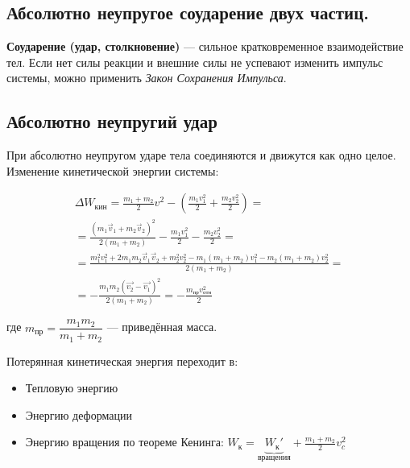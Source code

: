 \subsection{Абсолютно неупругое соударение двух частиц.}
\textbf{Соударение (удар, столкновение)} — сильное кратковременное взаимодействие тел. Если нет силы реакции и внешние силы не успевают изменить импульс системы, можно применить \textit{Закон Сохранения Импульса}.

\begin{center}
\end{center}

\subsection{Абсолютно неупругий удар}

При абсолютно неупругом ударе тела соединяются и движутся как одно целое. Изменение кинетической энергии системы:

\begin{multline*}
	\Delta W_\text{кин} = \frac{m_1 + m_2}{2} v^2 - \left(\frac{m_1 v_1^2}{2} + \frac{m_2 v_2^2}{2}\right) = \\
	= \frac{(m_1 \vec{v}_1 + m_2 \vec{v}_2)^2}{2(m_1 + m_2)} - \frac{m_1 v_1^2}{2} - \frac{m_2 v_2^2}{2} = \\
	= \frac{m_1^2 v_1^2 + 2m_1m_2\vec{v}_1\vec{v}_2 + m_2^2v_2^2 - m_1(m_1 + m_2)v_1^2 - m_2(m_1 + m_2)v_2^2}{2(m_1 + m_2)} = \\
	= -\frac{m_1m_2(\vec{v_2} - \vec{v_1})^2}{2(m_1 + m_2)} = -\frac{m_{\text{пр}} v_{\text{отн}}^2}{2}
\end{multline*}

где $m_\text{пр} = \dfrac{m_1m_2}{m_1 + m_2}$ — приведённая масса.

Потерянная кинетическая энергия переходит в:
\begin{itemize}
	\item Тепловую энергию
	\item Энергию деформации
	\item Энергию вращения по теореме Кенинга: $W_\text{к} = \underbrace{W_\text{к}'}_\text{вращения} + \frac{m_1 + m_2}{2} v_c^2$
\end{itemize}

